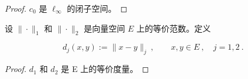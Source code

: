 \begin{proof}

$c_{0}$ 是 $\ell_{\infty}$ 的闭子空间。

\end{proof}

\begin{exercises}
\item[8.]

设 $ \|\cdot\|_1 $ 和 $ \|\cdot\|_2 $ 是向量空间 $ E $ 上的等价范数。定义

\[
d_{j}(x,y):=\|x-y\|_{j}~,\qquad x,y\in E~,\quad j=1,2~.
\]
\end{exercises}

\begin{proof}

$ d_{1} $ 和 $ d_{2} $ 是 E 上的等价度量。

\end{proof}

